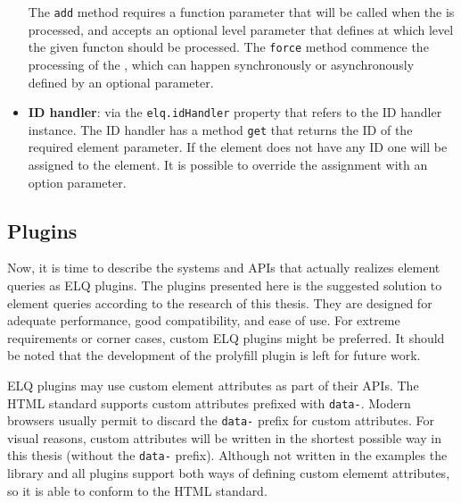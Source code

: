 \documentclass[a4paper,11pt]{kth-mag}
\newcommand{\code}[1]{\texttt{#1}}
\newcommand\abbr[2][]{\uppercase{#2}\ifthenelse{\equal{#1}{}}%
                     {}{#1}}
\begin{document}
\begin{itemize}
            The \code{add} method requires a function parameter that will be called when the  is processed, and accepts an optional level parameter that defines at which level the given functon should be processed.
            The \code{force} method commence the processing of the , which can happen synchronously or asynchronously defined by an optional parameter.
          \item
            \textbf{\abbr{ID} handler}: via the \code{elq.idHandler} property that refers to the \abbr{ID} handler instance. 
            The \abbr{ID} handler has a method \code{get} that returns the \abbr{ID} of the required element parameter.
            If the element does not have any \abbr{ID} one will be assigned to the \gls{element}.
            It is possible to override the assignment with an option parameter.
        \end{itemize}
      \subsection{Plugins}
        Now, it is time to describe the systems and \glspl{API} that actually realizes element queries as \gls{ELQ} plugins.
        The plugins presented here is the suggested solution to element queries according to the research of this thesis.
        They are designed for adequate performance, good compatibility, and ease of use.
        For extreme requirements or corner cases, custom \gls{ELQ} plugins might be preferred.
        It should be noted that the development of the prolyfill plugin is left for future work.

        \Gls{ELQ} plugins may use custom element attributes as part of their \glspl{API}.
        The \gls{HTML} standard supports custom attributes prefixed with \code{data-}.
        Modern \glspl{browser} usually permit to discard the \code{data-} prefix for custom attributes.
        For visual reasons, custom attributes will be written in the shortest possible way in this thesis (without the \code{data-} prefix).
        Although not written in the examples the library and all plugins support both ways of defining custom elememt attributes, so it is able to conform to the \gls{HTML} standard.
\end{document}

